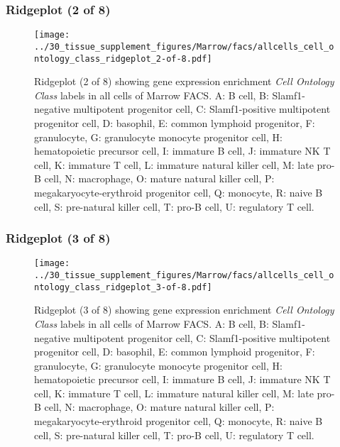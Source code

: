 \clearpage

\subsubsection{Ridgeplot (2 of 8)}
\begin{figure}[h]
\centering
\texttt{[image: ../30\_tissue\_supplement\_figures/Marrow/facs/allcells\_cell\_ontology\_class\_ridgeplot\_2-of-8.pdf]}

\caption{ Ridgeplot (2 of 8)  showing gene expression enrichment \emph{Cell Ontology Class} labels in all cells of Marrow FACS. A: B cell, B: Slamf1-negative multipotent progenitor cell, C: Slamf1-positive multipotent progenitor cell, D: basophil, E: common lymphoid progenitor, F: granulocyte, G: granulocyte monocyte progenitor cell, H: hematopoietic precursor cell, I: immature B cell, J: immature NK T cell, K: immature T cell, L: immature natural killer cell, M: late pro-B cell, N: macrophage, O: mature natural killer cell, P: megakaryocyte-erythroid progenitor cell, Q: monocyte, R: naive B cell, S: pre-natural killer cell, T: pro-B cell, U: regulatory T cell.}
\end{figure}


\clearpage

\subsubsection{Ridgeplot (3 of 8)}
\begin{figure}[h]
\centering
\texttt{[image: ../30\_tissue\_supplement\_figures/Marrow/facs/allcells\_cell\_ontology\_class\_ridgeplot\_3-of-8.pdf]}

\caption{ Ridgeplot (3 of 8)  showing gene expression enrichment \emph{Cell Ontology Class} labels in all cells of Marrow FACS. A: B cell, B: Slamf1-negative multipotent progenitor cell, C: Slamf1-positive multipotent progenitor cell, D: basophil, E: common lymphoid progenitor, F: granulocyte, G: granulocyte monocyte progenitor cell, H: hematopoietic precursor cell, I: immature B cell, J: immature NK T cell, K: immature T cell, L: immature natural killer cell, M: late pro-B cell, N: macrophage, O: mature natural killer cell, P: megakaryocyte-erythroid progenitor cell, Q: monocyte, R: naive B cell, S: pre-natural killer cell, T: pro-B cell, U: regulatory T cell.}
\end{figure}


\clearpage

